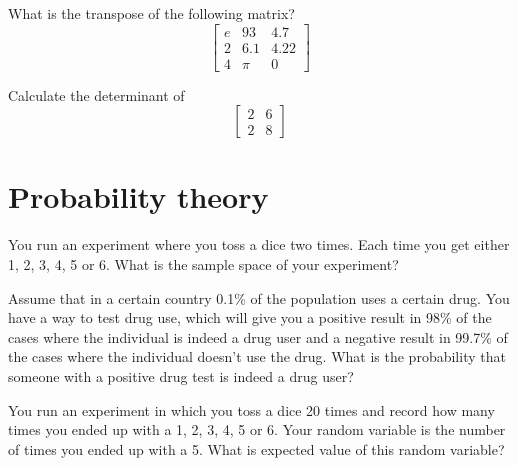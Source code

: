 \documentclass[10pt]{article}
\newenvironment{problem}[2][Problem]{\begin{trivlist}
\item[\hskip \labelsep {\bfseries #1}\hskip \labelsep {\bfseries #2.}]}{\end{trivlist}}
\begin{document}
\begin{problem}{4.3}
What is the transpose of the following matrix?
$$\begin{bmatrix}e & 93 & 4.7\\ 2 & 6.1 & 4.22 \\ 4 & \pi & 0\end{bmatrix}$$
\end{problem}

\begin{problem}{4.4}
Calculate the determinant of
$$\begin{bmatrix}2 & 6 \\ 2 & 8 \end{bmatrix} $$
\end{problem}

\section{Probability theory}

\begin{problem}{5.1}
You run an experiment where you toss a dice two times. Each time you get either 1, 2, 3, 4, 5 or 6. What is the sample space of your experiment?
\end{problem}

\begin{problem}{5.2}
Assume that in a certain country 0.1\% of the population uses a certain drug. You have a way to test drug use, which will give you a positive result in 98\% of the cases where the individual is indeed a drug user and a negative result in 99.7\% of the cases where the individual doesn't use the drug. What is the probability that someone with a positive drug test is indeed a drug user?
\end{problem}

\begin{problem}{5.3}
You run an experiment in which you toss a dice 20 times and record how many times you ended up with a 1, 2, 3, 4, 5 or 6. Your random variable is the number of times you ended up with a 5. What is  expected value of this random variable?
\end{problem}
\end{document}
